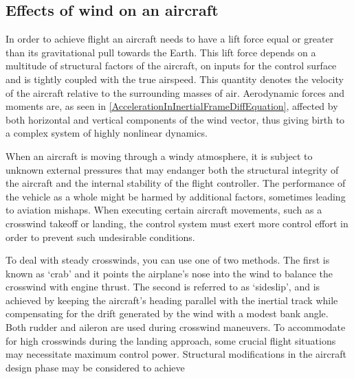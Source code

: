 \documentclass[conference]{IEEEtran}
\begin{document}
\subsection{Effects of wind on an aircraft}
In order to achieve flight an aircraft needs to have a lift force equal or
greater than its gravitational pull towards the Earth. This lift force depends on a multitude of structural
factors of the aircraft, on inputs for the control surface and is tightly coupled with the true airspeed. 
This quantity denotes the velocity of the
aircraft relative to the surrounding masses of air. Aerodynamic forces and moments are, as seen in {\ref{AccelerationInInertialFrameDiffEquation}}, affected by both
horizontal and vertical components of the wind vector, thus giving birth to a
complex system of highly nonlinear dynamics.
\par
When an aircraft is moving through a windy atmosphere, it is subject to unknown
external pressures that may endanger both the structural integrity of the
aircraft and the internal stability of the flight controller. The performance
of the vehicle as a whole might be harmed by additional factors, sometimes
leading to aviation mishaps. When executing certain aircraft movements, such as
a crosswind takeoff or landing, the control system must exert more control
effort in order to prevent such undesirable conditions.
\par
To deal with steady crosswinds, you can use one of two methods. The first is
known as `crab' and it points the airplane's nose into the wind to balance the
crosswind with engine thrust. The second is referred to as `sideslip', and is
achieved by keeping the aircraft's heading parallel with the inertial track
while compensating for the drift generated by the wind with a modest bank
angle. Both rudder and aileron are used during crosswind maneuvers. To
accommodate for high crosswinds during the landing approach, some crucial
flight situations may necessitate maximum control power. Structural
modifications in the aircraft design phase may be considered to achieve
\end{document}
